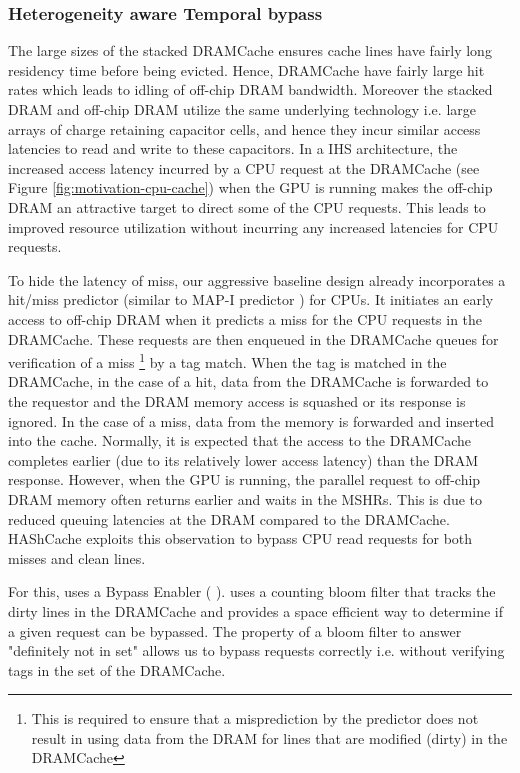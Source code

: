 \subsubsection{Heterogeneity aware Temporal bypass} \label{mechanism-bye}
The large sizes of the stacked DRAMCache ensures cache lines have fairly long residency time before being evicted. Hence, DRAMCache have fairly large hit rates which leads to idling of off-chip DRAM bandwidth. Moreover the stacked DRAM and off-chip DRAM utilize the same underlying technology i.e. large arrays of charge retaining capacitor cells, and hence they incur similar access latencies to read and write to these capacitors.
In a IHS architecture, the increased access latency incurred by a CPU request at the DRAMCache (see Figure \ref{fig:motivation-cpu-cache}) when the GPU is running makes the off-chip DRAM an attractive target to direct some of the CPU requests. This leads to improved resource utilization without incurring any increased latencies for CPU requests. 
\par To hide the latency of miss, our aggressive baseline design already incorporates a hit/miss predictor (similar to MAP-I predictor \cite{alloy}) for CPUs. It initiates an early access to off-chip DRAM when it predicts a miss for the CPU requests in the DRAMCache. These requests are then enqueued in the DRAMCache queues for verification of a miss 
\footnote{This is required to ensure that a misprediction by the predictor does not result in using data from the DRAM for lines that are modified (dirty) in the DRAMCache}
by a tag match. 
When the tag is matched in the DRAMCache, in the case of a hit, data from the DRAMCache is forwarded to the requestor and the DRAM memory access is squashed or its response is ignored. In the case of a miss, data from the memory is forwarded and inserted into the cache. Normally, it is expected that the access to the DRAMCache completes earlier (due to its relatively lower access latency) than the DRAM response. However, when the GPU is running, the parallel request to off-chip DRAM memory often returns earlier and waits in the MSHRs. This is due to reduced queuing latencies at the DRAM compared to the DRAMCache.  HAShCache exploits this observation to bypass CPU read requests for both misses and clean lines.
\par For this, \cachename uses a Bypass Enabler ( \bypassname). \bypassname uses a counting bloom filter \cite{bloom,counting-bloom} that tracks the dirty lines in the DRAMCache and provides a space efficient way to determine if a given request can be bypassed. The property of a bloom filter to answer "definitely not in set" allows us to bypass requests correctly i.e. without verifying tags in the set of the DRAMCache. 
